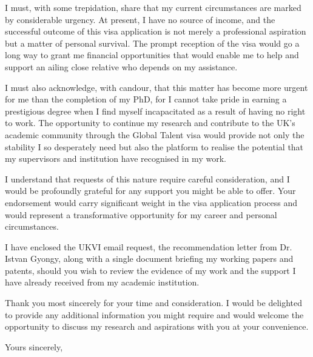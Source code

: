 \documentclass[12pt,a4paper]{letter}
\begin{document}
\begin{letter}
I must, with some trepidation, share that my current circumstances are marked by considerable urgency. At present, I have no source of income, and the successful outcome of this visa application is not merely a professional aspiration but a matter of personal survival. The prompt reception of the visa would go a long way to grant me financial opportunities that would enable me to help and support an ailing close relative who depends on my assistance. 

I must also acknowledge, with candour, that this matter has become more urgent for me than the completion of my PhD, for I cannot take pride in earning a prestigious degree when I find myself incapacitated as a result of having no right to work. The opportunity to continue my research and contribute to the UK's academic community through the Global Talent visa would provide not only the stability I so desperately need but also the platform to realise the potential that my supervisors and institution have recognised in my work.

I understand that requests of this nature require careful consideration, and I would be profoundly grateful for any support you might be able to offer. Your endorsement would carry significant weight in the visa application process and would represent a transformative opportunity for my career and personal circumstances.

I have enclosed the UKVI email request, the recommendation letter from Dr. Istvan Gyongy, along with a single document briefing my working papers and patents, should you wish to review the evidence of my work and the support I have already received from my academic institution.

Thank you most sincerely for your time and consideration. I would be delighted to provide any additional information you might require and would welcome the opportunity to discuss my research and aspirations with you at your convenience.

\closing{Yours sincerely,}

\signature{Deborah Akuoko}


\end{letter}
\end{document}
